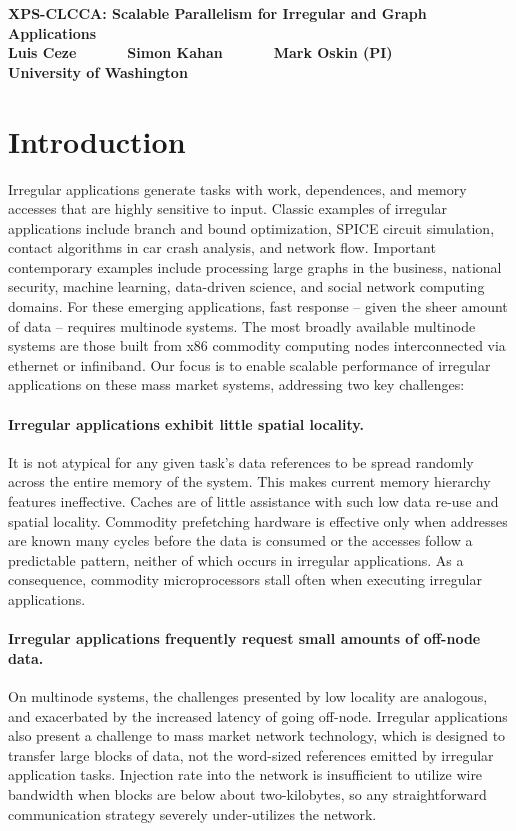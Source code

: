 


\begin{center}
  \textbf{\Large XPS-CLCCA: Scalable Parallelism for Irregular and Graph Applications}\\ \vspace{5mm}
  \textbf{Luis Ceze ~~~~~ Simon Kahan ~~~~~ Mark Oskin (PI)}\\
  \textbf{University of Washington}
\end{center}

\section{Introduction}

Irregular applications generate tasks with work, dependences, and memory
accesses that are highly sensitive to input. Classic examples of irregular
applications include branch and bound optimization, SPICE circuit simulation,
contact algorithms in car crash analysis, and network flow. Important
contemporary examples include processing large graphs in the business,
national security, machine learning, data-driven science, and social network
computing domains. For these emerging applications, fast response -- given the
sheer amount of data -- requires multinode systems. The most broadly available
multinode systems are those built from x86 commodity computing nodes
interconnected via ethernet or infiniband. Our focus is to enable scalable
performance of irregular applications on these mass market systems,
addressing two key challenges:

\paragraph{Irregular applications exhibit little spatial locality.} It is not atypical for any given task's data references to be spread randomly across the entire memory of the system. This makes current memory hierarchy features ineffective. Caches are of little assistance with such low data re-use and spatial locality. Commodity prefetching hardware is effective only when addresses are known many cycles before the data is consumed or the accesses follow a predictable pattern, neither of which occurs in irregular applications. As a consequence, commodity microprocessors stall often when executing irregular applications.

\paragraph{Irregular applications frequently request small amounts of off-node data.} On multinode systems, the challenges presented by low locality are analogous, and exacerbated by the increased latency of going off-node. Irregular applications also present a challenge to mass market network technology, which is designed to transfer large blocks of data, not the word-sized references emitted by irregular application tasks. Injection rate into the network is insufficient to utilize wire bandwidth when blocks are below about two-kilobytes, so any straightforward communication strategy severely under-utilizes the network.

